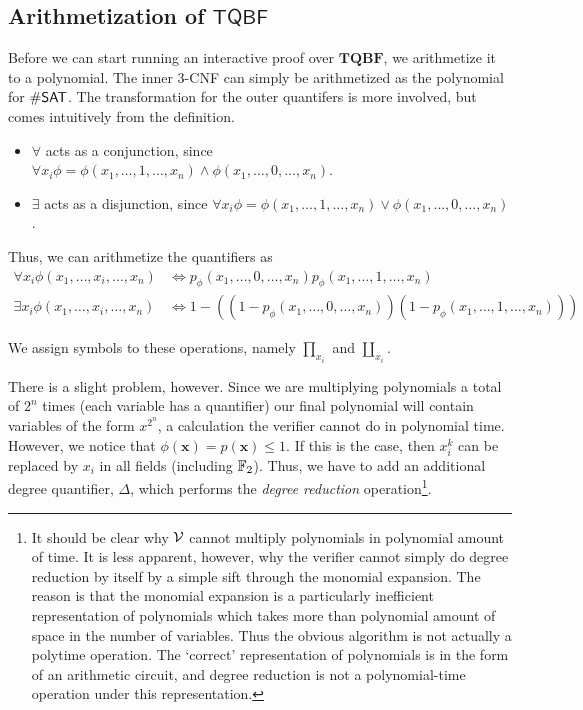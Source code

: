 \subsection{Arithmetization of $\mathsf{TQBF}$}
Before we can start running an interactive proof over $\mathbf{TQBF}$, we arithmetize it to a polynomial. The inner 3-CNF can simply be arithmetized as the polynomial for $\#\mathsf{SAT}$. The transformation for the outer quantifers is more involved, but comes intuitively from the definition.
\begin{itemize}
	\item $\forall$ acts as a conjunction, since $\forall x_i \phi=\phi(x_1,\dots,1,\dots,x_n)\wedge\phi(x_1,\dots,0,\dots,x_n)$.
	\item $\exists$ acts as a disjunction, since $\forall x_i \phi=\phi(x_1,\dots,1,\dots,x_n)\vee\phi(x_1,\dots,0,\dots,x_n)$.
\end{itemize}

Thus, we can arithmetize the quantifiers as
\begin{align*}
	\forall  x_i \phi(x_1,\dots,x_i,\dots,x_n)&\Leftrightarrow p_{\phi}(x_1,\dots,0,\dots,x_n) p_{\phi}(x_1,\dots,1,\dots,x_n)\\
	\exists  x_i \phi(x_1,\dots,x_i,\dots,x_n)&\Leftrightarrow 1-((1-p_{\phi}(x_1,\dots,0,\dots,x_n)) (1-p_{\phi}(x_1,\dots,1,\dots,x_n)))
\end{align*}

We assign symbols to these operations, namely $\prod_{x_i}$ and $\coprod_{x_i}$.

There is a slight problem, however. Since we are multiplying polynomials a total of $2^n$ times (each variable has a quantifier) our final polynomial will contain variables of the form $x^{2^n}$, a calculation the verifier cannot do in polynomial time. However, we notice that $\phi(\mathbf{x})=p(\mathbf{x})\leq 1$. If this is the case, then $x_i^k$ can be replaced by $x_i$ in all fields (including $\mathbb{F}_2$). Thus, we have to add an additional degree quantifier, $\Delta$, which performs the \textit{degree reduction} operation\footnote{It should be clear why $\mathcal{V}$ cannot multiply polynomials in polynomial amount of time. It is less apparent, however, why the verifier cannot simply do degree reduction by itself by a simple sift through the monomial expansion. The reason is that the monomial expansion is a particularly inefficient representation of polynomials which takes more than polynomial amount of space in the number of variables. Thus the obvious algorithm is not actually a polytime operation. The `correct' representation of polynomials is in the form of an arithmetic circuit, and degree reduction is not a polynomial-time operation under this representation.}.

